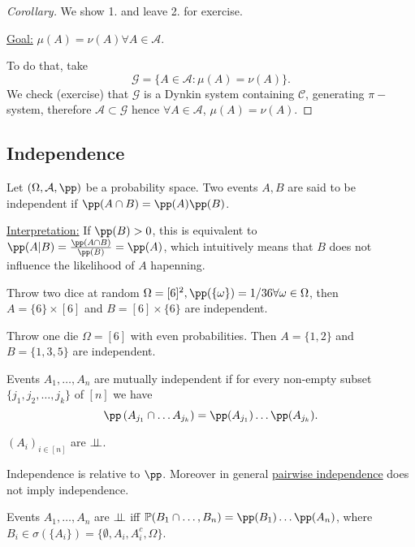 \documentclass[../main.tex]{subfiles}
\begin{document}
\begin{proof}[Corollary]
  We show 1. and leave 2. for exercise. 

  \underline{Goal:} $\mu(A) = \nu(A) \forall A \in \mathcal{A}$.

  To do that, take 
  \[
    \mathcal{G} = \{ A \in \mathcal{A} \colon \mu(A) = \nu(A) \} 
  .\]
  We check (exercise) that $\mathcal{G}$ is a Dynkin system containing $\mathcal{C}$, generating
  $\pi-$system, therefore $\mathcal{A} \subset \mathcal{G}$ hence $\forall A \in \mathcal{A}$,
  $\mu(A) = \nu(A)$.

\end{proof}

\subsection{Independence}

Let $(\Omega, \mathcal{A}, \pp)$ be a probability space. Two events $A, B$ are said to be
independent if $\pp(A \cap B) = \pp(A) \pp(B)$.

\underline{Interpretation:} If $\pp(B) > 0$, this is equivalent to $\pp(A \vert B) =
\frac{\pp(A \cap B)}{\pp(B)} = \pp(A)$, which intuitively means that $B$ does not influence the
likelihood of $A$ hapenning.

\begin{example}
  Throw two dice at random $\Omega = [6]^{2}, \pp(\{ \omega \} ) = 1/36
    \forall \omega \in \Omega$,
    then $A = \{ 6 \} \times [6]$ and $B = [6]\times \{ 6 \} $ are independent.
\end{example}
\begin{example}
  Throw one die $\Omega = [6]$ with even probabilities. Then $A = \{ 1,2 \} $ and $B = \{ 1, 3,
  5\} $ are independent.
\end{example}

\begin{definition}
    Events $A_1, \ldots, A_n$ are mutually independent if for every non-empty subset $\{j_1, j_2,
    \ldots, j_k\}$ of $[n]$ we have 
    \[
    \pp \left( A_{j_1} \cap \ldots A_{j_k} \right) = \pp(A_{j_1}) \ldots \pp(A_{j_k})
    .\] 
\end{definition}

\begin{notation}
  $(A_i)_{i \in [n]}$ are  $\perp\!\!\!\!\,\perp$.
\end{notation}
\begin{remark}
  Independence is relative to $\pp$. Moreover in general \underline{pairwise independence} does
  not imply independence.
\end{remark}

\begin{proposition}
  Events $A_1, \ldots, A_n$ are $\perp\!\!\!\!\,\perp$ iff $\mathbb{P}(B_1 \cap \ldots, B_n) = \pp(B_1)
  \ldots \pp(A_n)$, where $B_i \in \sigma(\{ A_i \}) = \{ \emptyset, A_i, A_i^c, \Omega \} $.

\end{proposition}
\end{document}
